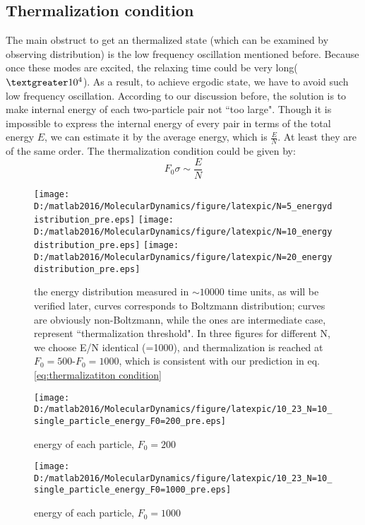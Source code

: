 \documentclass[aps,pre,twocolumn
,groupedaddress]{revtex4-1}
\begin{document}
\subsection{Thermalization condition}
The main obstruct to get an thermalized state (which can be examined by observing distribution) is the low frequency oscillation mentioned before. Because once these modes are excited, the relaxing time could be very long($\textgreater 10^4$). As a result, to achieve ergodic state, we have to avoid such low frequency oscillation. According to our discussion before, the solution is to make internal energy of each two-particle pair not ``too large". Though it is impossible to express the internal energy of every pair in terms of the total energy $E$, we can estimate it by the average energy, which is $\frac{E}{N}$. At least they are of the same order. The thermalization condition could be given by:
\begin{equation}
F_0\sigma\sim\frac{E}{N}
\label{eq:thermalizatiton condition}
\end{equation}



\begin{figure}[hbtp]
\centering
\texttt{[image: D:/matlab2016/MolecularDynamics/figure/latexpic/N=5\_energydistribution\_pre.eps]} 
\texttt{[image: D:/matlab2016/MolecularDynamics/figure/latexpic/N=10\_energydistribution\_pre.eps]} 
\texttt{[image: D:/matlab2016/MolecularDynamics/figure/latexpic/N=20\_energydistribution\_pre.eps]}
\caption{the energy distribution measured in $\sim 10000$ time units, as will be verified later, {\color{green}{green}} curves corresponds to Boltzmann distribution; {\color{red}{red}} curves are obviously non-Boltzmann, while the {\color{yellow}{yellow}} ones are intermediate case, represent ``thermalization threshold". In three figures for different N, we choose E/N identical (=1000), and thermalization is reached at $F_0=500$-$F_0=1000$, which is consistent with our prediction in eq.\ref{eq:thermalizatiton condition}}
\label{fig:thermalization5}

\end{figure}




\begin{figure}
\texttt{[image: D:/matlab2016/MolecularDynamics/figure/latexpic/10\_23\_N=10\_single\_particle\_energy\_F0=200\_pre.eps]} 
\caption{energy of each particle, $F_0=200$}
\label{fig:thermalization6}

\texttt{[image: D:/matlab2016/MolecularDynamics/figure/latexpic/10\_23\_N=10\_single\_particle\_energy\_F0=1000\_pre.eps]} 
\caption{energy of each particle, $F_0=1000$}
\label{fig:thermalization7}
\end{figure}
\end{document}
